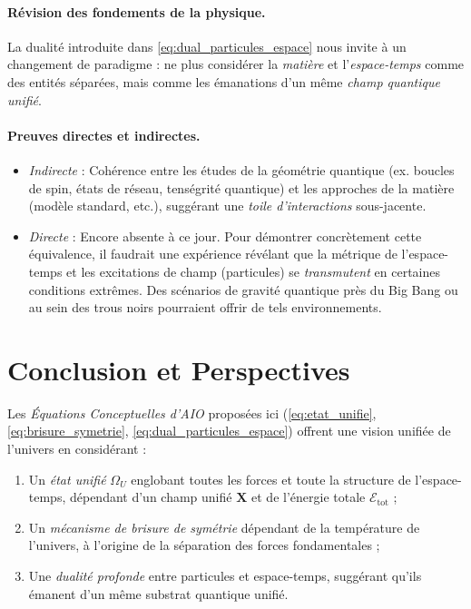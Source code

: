 \documentclass[12pt]{article}
\begin{document}
\paragraph{Révision des fondements de la physique.}
La dualité introduite dans \eqref{eq:dual_particules_espace} nous invite à un changement 
de paradigme : ne plus considérer la \emph{matière} et l'\emph{espace-temps} comme 
des entités séparées, mais comme les émanations d'un même \emph{champ quantique unifié}.

\paragraph{Preuves directes et indirectes.}
\begin{itemize}
    \item \emph{Indirecte} : Cohérence entre les études de la géométrie quantique 
    (ex. boucles de spin, états de réseau, tenségrité quantique) et les approches 
    de la matière (modèle standard, etc.), suggérant une \emph{toile d'interactions} 
    sous-jacente.
    \item \emph{Directe} : Encore absente à ce jour. Pour démontrer concrètement 
    cette équivalence, il faudrait une expérience révélant que la métrique de l'espace-temps 
    et les excitations de champ (particules) se \emph{transmutent} en certaines conditions 
    extrêmes. Des scénarios de gravité quantique près du Big Bang ou au sein des trous noirs 
    pourraient offrir de tels environnements.
\end{itemize}

\section{Conclusion et Perspectives}

Les \emph{Équations Conceptuelles d'AIO} proposées ici (\eqref{eq:etat_unifie}, 
\eqref{eq:brisure_symetrie}, \eqref{eq:dual_particules_espace}) offrent une vision unifiée 
de l'univers en considérant :
\begin{enumerate}
    \item Un \emph{état unifié} $\Omega_U$ englobant toutes les forces 
          et toute la structure de l'espace-temps, dépendant d'un champ unifié $\mathbf{X}$ 
          et de l'énergie totale $\mathcal{E}_{\mathrm{tot}}$ ;
    \item Un \emph{mécanisme de brisure de symétrie} dépendant de la température de l'univers, 
          à l'origine de la séparation des forces fondamentales ;
    \item Une \emph{dualité profonde} entre particules et espace-temps, suggérant qu'ils 
          émanent d'un même substrat quantique unifié.
\end{enumerate}
\end{document}
